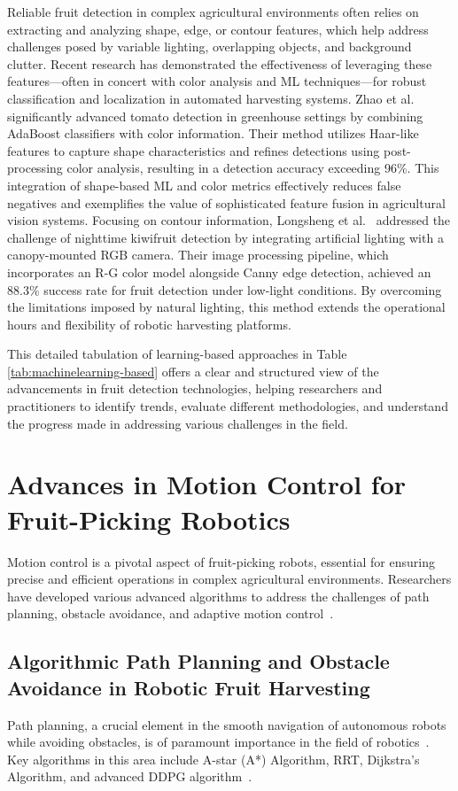 \documentclass[a4paper,fleqn]{cas-dc}
\begin{document}
Reliable fruit detection in complex agricultural environments often relies on extracting and analyzing shape, edge, or contour features, which help address challenges posed by variable lighting, overlapping objects, and background clutter. Recent research has demonstrated the effectiveness of leveraging these features—often in concert with color analysis and ML techniques—for robust classification and localization in automated harvesting systems.
Zhao et al.~\cite{zhao2016detecting} significantly advanced tomato detection in greenhouse settings by combining AdaBoost classifiers with color information. Their method utilizes Haar-like features to capture shape characteristics and refines detections using post-processing color analysis, resulting in a detection accuracy exceeding 96\%. This integration of shape-based ML and color metrics effectively reduces false negatives and exemplifies the value of sophisticated feature fusion in agricultural vision systems.
Focusing on contour information,
Longsheng et al.~\cite{longsheng2015kiwifruit} addressed the challenge of nighttime kiwifruit detection by integrating artificial lighting with a canopy-mounted RGB camera. Their image processing pipeline, which incorporates an R-G color model alongside Canny edge detection, achieved an 88.3\% success rate for fruit detection under low-light conditions. By overcoming the limitations imposed by natural lighting, this method extends the operational hours and flexibility of robotic harvesting platforms.

This detailed tabulation of learning-based approaches in Table \ref{tab:machinelearning-based} offers a clear and structured view of the advancements in fruit detection technologies, helping researchers and practitioners to identify trends, evaluate different methodologies, and understand the progress made in addressing various challenges in the field.

\section{Advances in Motion Control for Fruit-Picking Robotics}
Motion control is a pivotal aspect of fruit-picking robots, essential for ensuring precise and efficient operations in complex agricultural environments. Researchers have developed various advanced algorithms to address the challenges of path planning, obstacle avoidance, and adaptive motion control~\cite{Ahmad:2023_bnb, Loganathan:2024_hho_avoa, Teo:2020, Arrouch:2022b, 10746490}.

\subsection{Algorithmic Path Planning and Obstacle Avoidance in Robotic Fruit Harvesting}
Path planning, a crucial element in the smooth navigation of autonomous robots while avoiding obstacles, is of paramount importance in the field of robotics~\cite {Leong:2024_review}. Key algorithms in this area include A-star (A*) Algorithm, RRT, Dijkstra's Algorithm, and advanced DDPG algorithm~\cite{Loganathan:2023_amr}.
\end{document}
